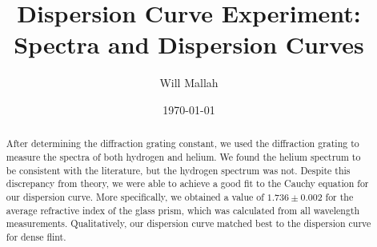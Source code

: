 \documentclass[12pt]{article}
\title{Dispersion Curve Experiment: Spectra and Dispersion Curves}
\author{Will Mallah}
\date{\today}
\begin{document}
\maketitle

\begin{abstract}
    After determining the diffraction grating constant, we used the diffraction grating to measure the spectra of both hydrogen and helium. We found the helium spectrum to be consistent with the literature, but the hydrogen spectrum was not. Despite this discrepancy from theory, we were able to achieve a good fit to the Cauchy equation for our dispersion curve. More specifically, we obtained a value of $1.736 \pm 0.002$ for the average refractive index of the glass prism, which was calculated from all wavelength measurements. Qualitatively, our dispersion curve matched best to the dispersion curve for dense flint.
\end{abstract}
\end{document}
